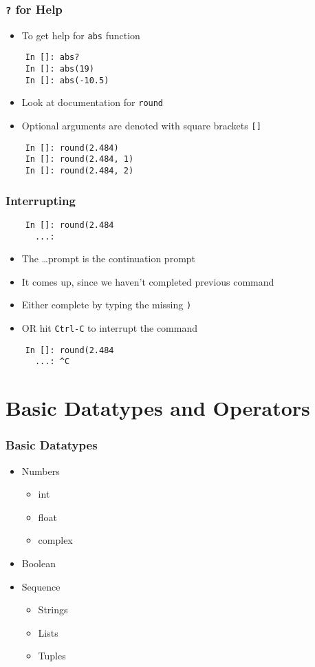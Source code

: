 \begin{frame}[fragile]
  \frametitle{\texttt{?} for Help}
  \begin{itemize}
  \item To get help for \texttt{abs} function
  \end{itemize}
  \begin{lstlisting}
    In []: abs?
    In []: abs(19)
    In []: abs(-10.5)
  \end{lstlisting}
  \begin{itemize}
  \item Look at documentation for \texttt{round}
  \item Optional arguments are denoted with square brackets
    \texttt{[]} 
  \end{itemize}
  \begin{lstlisting}
    In []: round(2.484)
    In []: round(2.484, 1)
    In []: round(2.484, 2)
  \end{lstlisting}
\end{frame}

\begin{frame}[fragile]
  \frametitle{Interrupting}
  \begin{lstlisting}
    In []: round(2.484
      ...: 
  \end{lstlisting}
  \begin{itemize}
  \item The \ldots prompt is the continuation prompt
  \item It comes up, since we haven't completed previous command
  \item Either complete by typing the missing \texttt{)}
  \item OR hit \texttt{Ctrl-C} to interrupt the command
  \end{itemize}
  \begin{lstlisting}
    In []: round(2.484
      ...: ^C
  \end{lstlisting}
\end{frame}

\section{Basic Datatypes and Operators}

\begin{frame}[fragile]
  \frametitle{Basic Datatypes}
  \begin{itemize}
  \item Numbers
    \begin{itemize}
    \item int
    \item float
    \item complex
    \end{itemize}
  \item Boolean
  \item Sequence
    \begin{itemize}
    \item Strings
    \item Lists
    \item Tuples
    \end{itemize}
  \end{itemize}
\end{frame}

